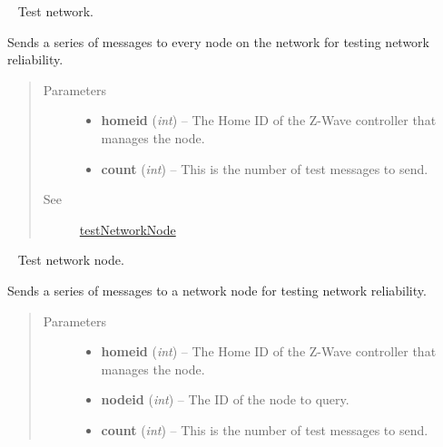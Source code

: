 \documentclass[letterpaper,10pt,english]{sphinxmanual}
\begin{document}
\begin{fulllineitems}
\begin{fulllineitems}
\label{libopenzwave:libopenzwave.PyManager.testNetwork}~\label{libopenzwave:testnetwork}
Test network.

Sends a series of messages to every node on the network for testing network reliability.
\begin{quote}\begin{description}
\item[{Parameters}] \leavevmode\begin{itemize}
\item {} 
\textbf{homeid} (\emph{int}) -- The Home ID of the Z-Wave controller that manages the node.

\item {} 
\textbf{count} (\emph{int}) -- This is the number of test messages to send.

\end{itemize}

\item[{See}] \leavevmode
{\hyperref[libopenzwave:testnetworknode]{testNetworkNode}}

\end{description}\end{quote}

\end{fulllineitems}


\begin{fulllineitems}
\label{libopenzwave:libopenzwave.PyManager.testNetworkNode}~\label{libopenzwave:testnetworknode}
Test network node.

Sends a series of messages to a network node for testing network reliability.
\begin{quote}\begin{description}
\item[{Parameters}] \leavevmode\begin{itemize}
\item {} 
\textbf{homeid} (\emph{int}) -- The Home ID of the Z-Wave controller that manages the node.

\item {} 
\textbf{nodeid} (\emph{int}) -- The ID of the node to query.

\item {} 
\textbf{count} (\emph{int}) -- This is the number of test messages to send.


\end{itemize}
\end{description}
\end{quote}
\end{fulllineitems}
\end{fulllineitems}
\end{document}
